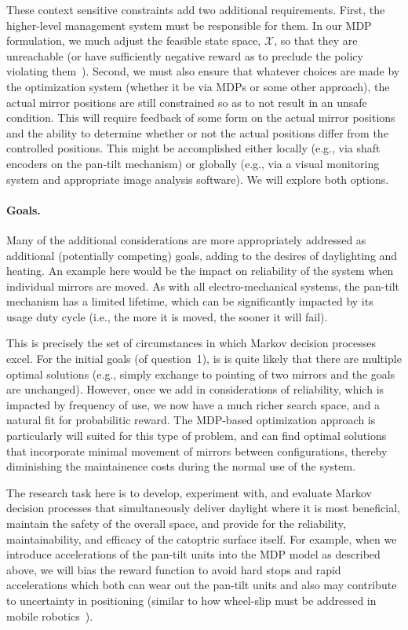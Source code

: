 These context sensitive constraints add two additional requirements.
First, the higher-level management system must be responsible for them.
In our MDP formulation, we much adjust the feasible state space, $\mathcal{X}$,
so that they are unreachable (or have sufficiently negative reward as to
preclude the policy violating them~\cite{tblwgs11,tggs10}).
Second, we must also ensure that whatever choices are made by the optimization
system (whether it be via MDPs or some other approach), the actual
mirror positions are still constrained so as to not result in an
unsafe condition.  This will require feedback of some form on the actual
mirror positions and the ability to determine whether or not the actual
positions differ from the controlled positions.  This might be accomplished
either locally (e.g., via shaft encoders on the pan-tilt mechanism) or
globally (e.g., via a visual monitoring system and appropriate image analysis
software).
We will explore both options.

\paragraph{Goals.}
Many of the additional considerations are more appropriately addressed as
additional (potentially competing) goals, adding to the desires of
daylighting and heating.  An example here would be the
impact on reliability of the system when individual mirrors are moved.  As
with all electro-mechanical systems, the pan-tilt mechanism has a limited
lifetime, which can be significantly impacted by its usage duty cycle
(i.e., the more it is moved, the sooner it will fail).

This is precisely the set of circumstances in which Markov decision
processes excel. For the initial goals (of question~1), is is quite
likely that there are multiple optimal solutions (e.g., simply exchange
to pointing of two mirrors and the goals are unchanged).  However,
once we add in considerations of reliability, which is impacted by
frequency of use, we now have a much richer search space,
and a natural fit for probabilitic reward.
The MDP-based optimization approach is particularly will suited for
this type of problem, and can find optimal solutions that incorporate
minimal movement of mirrors between configurations, thereby diminishing
the maintainence costs during the normal use of the system.

The research task here is to develop, experiment with, and evaluate
Markov decision processes that simultaneously deliver daylight where it
is most beneficial, maintain the safety of the overall space,
and provide for the reliability, maintainability, and efficacy of the
catoptric surface itself.  For example, when we introduce accelerations
of the pan-tilt units into the MDP model as described above, we will bias
the reward function to avoid hard stops and rapid accelerations which both
can wear out the pan-tilt units and also may contribute to uncertainty in
positioning (similar to how wheel-slip must be addressed in mobile
robotics~\cite{mn87}).

